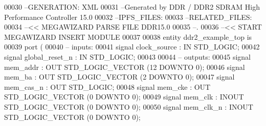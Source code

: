 \begin{DoxyCode}
{00030 \textcolor{keyword}{--GENERATION: XML}
00031 \textcolor{keyword}{--Generated by DDR / DDR2 SDRAM High Performance Controller 15.0}
00032 \textcolor{keyword}{--IPFS\_FILES:}
00033 \textcolor{keyword}{--RELATED\_FILES:}
00034 \textcolor{keyword}{--<< MEGAWIZARD PARSE FILE DDR15.0}
00035 \textcolor{keyword}{--.}
00036 \textcolor{keyword}{--<< START MEGAWIZARD INSERT MODULE}
00037 
00038 \textcolor{keywordflow}{entity }ddr2_example_top \textcolor{keywordflow}{is} 
00039         \textcolor{keywordflow}{port} \textcolor{vhdlchar}{(}
00040 \textcolor{keyword}{              -- inputs:}
00041                  \textcolor{keywordflow}{signal} \textcolor{vhdlchar}{clock_source} \textcolor{vhdlchar}{:} \textcolor{keywordflow}{IN} \textcolor{comment}{STD\_LOGIC};
00042                  \textcolor{keywordflow}{signal} \textcolor{vhdlchar}{global_reset_n} \textcolor{vhdlchar}{:} \textcolor{keywordflow}{IN} \textcolor{comment}{STD\_LOGIC};
00043 
00044 \textcolor{keyword}{              -- outputs:}
00045                  \textcolor{keywordflow}{signal} \textcolor{vhdlchar}{mem_addr} \textcolor{vhdlchar}{:} \textcolor{keywordflow}{OUT} \textcolor{comment}{STD\_LOGIC\_VECTOR} \textcolor{vhdlchar}{(}\textcolor{vhdllogic}{}\textcolor{vhdllogic}{12} \textcolor{keywordflow}{DOWNTO} \textcolor{vhdllogic}{}\textcolor{vhdllogic}{0}\textcolor{vhdlchar}{)};
00046                  \textcolor{keywordflow}{signal} \textcolor{vhdlchar}{mem_ba} \textcolor{vhdlchar}{:} \textcolor{keywordflow}{OUT} \textcolor{comment}{STD\_LOGIC\_VECTOR} \textcolor{vhdlchar}{(}\textcolor{vhdllogic}{}\textcolor{vhdllogic}{2} \textcolor{keywordflow}{DOWNTO} \textcolor{vhdllogic}{}\textcolor{vhdllogic}{0}\textcolor{vhdlchar}{)};
00047                  \textcolor{keywordflow}{signal} \textcolor{vhdlchar}{mem_cas_n} \textcolor{vhdlchar}{:} \textcolor{keywordflow}{OUT} \textcolor{comment}{STD\_LOGIC};
00048                  \textcolor{keywordflow}{signal} \textcolor{vhdlchar}{mem_cke} \textcolor{vhdlchar}{:} \textcolor{keywordflow}{OUT} \textcolor{comment}{STD\_LOGIC\_VECTOR} \textcolor{vhdlchar}{(}\textcolor{vhdllogic}{}\textcolor{vhdllogic}{0} \textcolor{keywordflow}{DOWNTO} \textcolor{vhdllogic}{}\textcolor{vhdllogic}{0}\textcolor{vhdlchar}{)};
00049                  \textcolor{keywordflow}{signal} \textcolor{vhdlchar}{mem_clk} \textcolor{vhdlchar}{:} \textcolor{keywordflow}{INOUT} \textcolor{comment}{STD\_LOGIC\_VECTOR} \textcolor{vhdlchar}{(}\textcolor{vhdllogic}{}\textcolor{vhdllogic}{0} \textcolor{keywordflow}{DOWNTO} \textcolor{vhdllogic}{}\textcolor{vhdllogic}{0}\textcolor{vhdlchar}{)};
00050                  \textcolor{keywordflow}{signal} \textcolor{vhdlchar}{mem_clk_n} \textcolor{vhdlchar}{:} \textcolor{keywordflow}{INOUT} \textcolor{comment}{STD\_LOGIC\_VECTOR} \textcolor{vhdlchar}{(}\textcolor{vhdllogic}{}\textcolor{vhdllogic}{0} \textcolor{keywordflow}{DOWNTO} \textcolor{vhdllogic}{}\textcolor{vhdllogic}{0}\textcolor{vhdlchar}{)};
}
\end{DoxyCode}
